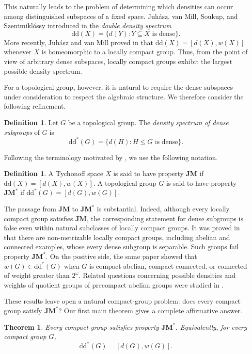 \documentclass[12pt]{amsart}
\newtheorem{thmA}{Theorem}
\theoremstyle{definition}
\newtheorem{definition}[theorem]{Definition}
\numberwithin{equation}{section}
\theoremstyle{remark}
\def\dd{\mathrm{dd}}
\def\JM{\mathbf{JM}}
\begin{document}
This naturally leads to the problem of determining which densities can
occur among distinguished subspaces of a fixed space. Juh\'asz, van Mill,
Soukup, and Szentmikl\'ossy introduced in \cite{JvMSS} the
\emph{double density spectrum}
\[
\dd(X)=\{d(Y):Y\subseteq X\text{ is dense}\}.
\]
More recently, Juh\'asz and van Mill proved in \cite{JvM} that
$\dd(X)=[d(X),w(X)]$ whenever $X$ is homeomorphic to a locally compact
group. Thus, from the point of view of arbitrary dense subspaces, locally
compact groups exhibit the largest possible density spectrum.

For a topological group, however, it is natural to require the dense
subspaces under consideration to respect the algebraic structure. We
therefore consider the following refinement.

\begin{definition}
Let $G$ be a topological group. The \emph{density spectrum of dense
subgroups} of $G$ is
\[
\dd^*(G)=\{d(H):H\leq G\text{ is dense}\}.
\]
\end{definition}

Following the terminology motivated by \cite{JvM}, we use the following
notation.

\begin{definition}
A Tychonoff space $X$ is said to have property $\JM$ if
$\dd(X)=[d(X),w(X)]$. A topological group $G$ is said to have property
$\JM^*$ if
$\dd^*(G)=[d(G),w(G)]$.
\end{definition}

The passage from $\JM$ to $\JM^*$ is substantial. Indeed, although every
locally compact group satisfies $\JM$, the corresponding statement for
dense subgroups is false even within natural subclasses of locally compact
groups. It was proved in \cite{Peng} that there are non-metrizable locally
compact groups, including abelian and connected examples, whose every
dense subgroup is separable. Such groups fail property $\JM^*$. On the
positive side, the same paper showed that $w(G)\in\dd^*(G)$ when $G$ is
compact abelian, compact connected, or connected of weight greater than
$2^\omega$. Related questions concerning possible densities and weights
of quotient groups of precompact abelian groups were studied in
\cite{Peng1}.

These results leave open a natural compact-group problem: does every
compact group satisfy $\JM^*$? Our first main theorem gives a complete
affirmative answer.

\begin{thmA}\label{ThA}
Every compact group satisfies property $\JM^*$. Equivalently, for every
compact group $G$,
\[
\dd^*(G)=[d(G),w(G)].
\]
\end{thmA}
\end{document}
